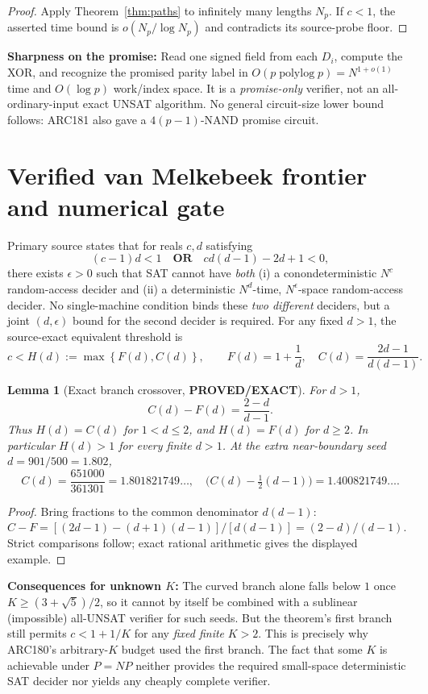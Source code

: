 \documentclass[11pt]{article}
\newtheorem{lemma}[theorem]{Lemma}
\newcommand{\PROVED}{\textbf{PROVED/EXACT}}
\begin{document}
\begin{proof}
Apply Theorem~\ref{thm:paths} to infinitely many lengths $N_p$. If $c<1$, the asserted time bound is $o(N_p/\log N_p)$ and contradicts its source-probe floor.\qedhere
\end{proof}
\noindent\textbf{Sharpness on the promise:} Read one signed field from each $D_i$, compute the XOR, and recognize the promised parity label in $O(p\operatorname{polylog}p)=N^{1+o(1)}$ time and $O(\log p)$ work/index space. It is a \emph{promise-only} verifier, not an all-ordinary-input exact UNSAT algorithm. No general circuit-size lower bound follows: ARC181 also gave a $4(p-1)$-NAND promise circuit.

\section{Verified van Melkebeek frontier and numerical gate}
Primary source \cite[Theorem 1.3, p.~2]{vm07} states that for reals $c,d$ satisfying
\[
 (c-1)d<1 \quad \textbf{OR}\quad cd(d-1)-2d+1<0,
\]
there exists $\epsilon>0$ such that SAT cannot have \emph{both} (i) a conondeterministic $N^c$ random-access decider and (ii) a deterministic $N^d$-time, $N^{\epsilon}$-space random-access decider. No single-machine condition binds these \emph{two different} deciders, but a joint $(d,\epsilon)$ bound for the second decider is required. For any fixed $d>1$, the source-exact equivalent threshold is
\[
 \boxed{c<H(d):=\max\left\{F(d),C(d)\right\}},\qquad
 F(d)=1+\frac1d,\quad C(d)=\frac{2d-1}{d(d-1)}.
\]
\begin{lemma}[Exact branch crossover, \PROVED]
For $d>1$,
\[
 C(d)-F(d)=\frac{2-d}{d-1}.
\]
Thus $H(d)=C(d)$ for $1<d\le2$, and $H(d)=F(d)$ for $d\ge2$. In particular $H(d)>1$ for every finite $d>1$. At the \emph{extra} near-boundary seed $d=901/500=1.802$,
\[
 C(d)=\frac{651000}{361301}=1.801821749\ldots,
 \quad \bigl(C(d)-\tfrac12(d-1)\bigr)=1.400821749\ldots.
\]
\end{lemma}
\begin{proof}
Bring fractions to the common denominator $d(d-1)$:
$C-F=[(2d-1)-(d+1)(d-1)]/[d(d-1)]=(2-d)/(d-1)$. Strict comparisons follow; exact rational arithmetic gives the displayed example.\qedhere
\end{proof}
\noindent\textbf{Consequences for unknown $K$:} The curved branch alone falls below $1$ once $K\ge (3+\sqrt5)/2$, so it cannot by itself be combined with a sublinear (impossible) all-UNSAT verifier for such seeds. But the theorem's first branch still permits $c<1+1/K$ for any \emph{fixed finite} $K>2$. This is precisely why ARC180's arbitrary-$K$ budget used the first branch. The fact that some $K$ is achievable under $P=NP$ neither provides the required small-space deterministic SAT decider nor yields any cheaply complete verifier.
\end{document}
